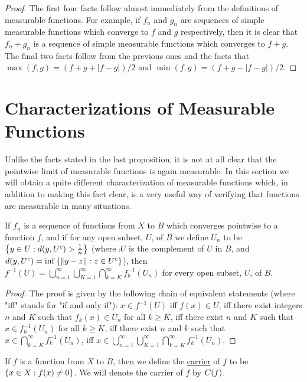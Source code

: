 \begin{proof}
The first four facts follow almost immediately from the definitions of measurable functions. For example, if $f_n$ and $g_n$ are sequences of simple measurable functions which converge to $f$ and $g$ respectively, then it is clear that $f_n+g_n$ is a sequence of simple measurable functions which converges to $f+g$. The final two facts follow from the previous ones and the facts that $\max(f, g)=(f+g+|f-g|)/2$ and $\min(f, g)=(f+g-|f-g|)/2$.
\end{proof}

\section{Characterizations of Measurable Functions}

Unlike the facts stated in the last proposition, it is not at all clear that the pointwise limit of measurable functions is again measurable. In this section we will obtain a quite different characterization of measurable functions which, in addition to making this fact clear, is a very useful way of verifying that functions are measurable in many situations.

\begin{lemma}
If $f_n$ is a sequence of functions from $X$ to $B$ which converges pointwise to a function $f$, and if for any open subset, $U$, of $B$ we define $U_n$ to be $\left\{y \in U: d(y, {U}^c)>\frac1n\right\}$ (where $\comp{U}$ is the complement of $U$ in $B$, and $d(y, {U}^c)=\inf\left\{\norm{y-z}: z \in{U}^c\right\}$), then $f^{-1}(U)=\bigcup_{n=1}^\infty\bigcup_{K=1}^\infty\bigcap_{k=K}^\infty f_k^{-1}(U_n)$ for every open subset, $U$, of $B$.
\end{lemma}

\begin{proof}
The proof is given by the following chain of equivalent statements (where "iff" stands for "if and only if"): $x \in f^{-1}(U)$ iff $f(x) \in U$, iff there exist integers $n$ and $K$ such that $f_k(x) \in U_n$ for all $k \geq K$, iff there exist $n$ and $K$ such that $x \in f_k^{-1}(U_n)$ for all $k \geq K$, iff there exist $n$ and $k$ such that $x \in \bigcap_{k=K}^\infty f_k^{-1}(U_n)$, iff $x \in \bigcup_{n=1}^\infty \bigcup_{K=1}^\infty \bigcap_{k=K}^\infty f_k^{-1}(U_n)$.
\end{proof}

\begin{definition}
If $f$ is a function from $X$ to $B$, then we define the \underline{carrier} of $f$ to be $\left\{x \in X: f(x) \neq 0\right\}$. We will denote the carrier of $f$ by $C(f)$. 
\end{definition}

